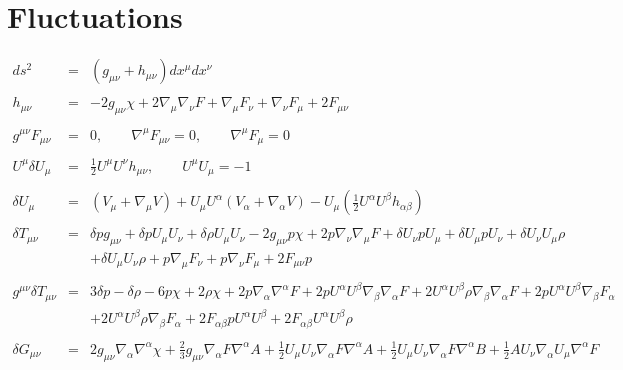 \documentclass[10pt,letterpaper]{article}
\numberwithin{equation}{section}
\begin{document}
\section{Fluctuations}
\begin{eqnarray}
ds^2 &=& ( g_{\mu\nu}+ h_{\mu\nu}) dx^\mu dx^\nu
\\ \nonumber\\
h_{\mu\nu} &=& -2 g_{\mu\nu}\chi + 2\nabla_\mu \nabla_\nu F +\nabla_\mu F_\nu +\nabla_\nu F_\mu+ 2F_{\mu\nu}
\label{svt}
\\ \nonumber\\
g^{\mu\nu} F_{\mu\nu} &=&0,\qquad \nabla^\mu F_{\mu\nu} = 0,\qquad \nabla^\mu F_\mu=0 
\\ \nonumber\\
U^\mu \delta U_\mu &=& \tfrac12 U^\mu U^\nu h_{\mu\nu},\qquad U^\mu U_\mu = -1
\\ \nonumber\\
\delta U_{\mu} &=& (V_\mu + \nabla_\mu V) + U_\mu U^\alpha(V_\alpha + \nabla_\alpha V)-U_\mu\left(\tfrac12 U^\alpha U^\beta h_{\alpha\beta}\right)
\\ \nonumber\\
\delta T_{\mu\nu}&=& \delta p g_{\mu \nu } + \delta p U_{\mu } U_{\nu } + \delta \rho U_{\mu } U_{\nu } - 2 g_{\mu \nu } p \chi + 2 p \nabla_{\nu }\nabla_{\mu }F+\delta U_{\nu } p U_{\mu } + \delta U_{\mu } p U_{\nu } + \delta U_{\nu } U_{\mu } \rho \nonumber \\ 
&& + \delta U_{\mu } U_{\nu } \rho + p \nabla_{\mu }F_{\nu } + p \nabla_{\nu }F_{\mu }+2 F_{\mu \nu } p
\\  \nonumber\\ 
g^{\mu\nu}\delta T_{\mu\nu}&=& 3 \delta p -  \delta \rho - 6 p \chi + 2 \rho \chi + 2 p \nabla_{\alpha }\nabla^{\alpha }F + 2 p U^{\alpha } U^{\beta } \nabla_{\beta }\nabla_{\alpha }F + 2 U^{\alpha } U^{\beta } \rho \nabla_{\beta }\nabla_{\alpha }F+2 p U^{\alpha } U^{\beta } \nabla_{\beta }F_{\alpha } \nonumber \\ 
&& + 2 U^{\alpha } U^{\beta } \rho \nabla_{\beta }F_{\alpha }+2 F_{\alpha \beta } p U^{\alpha } U^{\beta } + 2 F_{\alpha \beta } U^{\alpha } U^{\beta } \rho 
\nonumber\\  \\ 
\delta G_{\mu\nu}&=& 2 g_{\mu \nu } \nabla_{\alpha }\nabla^{\alpha }\chi + \tfrac{2}{3} g_{\mu \nu } \nabla_{\alpha }F \nabla^{\alpha }A + \tfrac{1}{2} U_{\mu } U_{\nu } \nabla_{\alpha }F \nabla^{\alpha }A + \tfrac{1}{2} U_{\mu } U_{\nu } \nabla_{\alpha }F \nabla^{\alpha }B + \tfrac{1}{2} A U_{\nu } \nabla_{\alpha }U_{\mu } \nabla^{\alpha }F \nonumber \\ 

\end{eqnarray}
\end{document}
